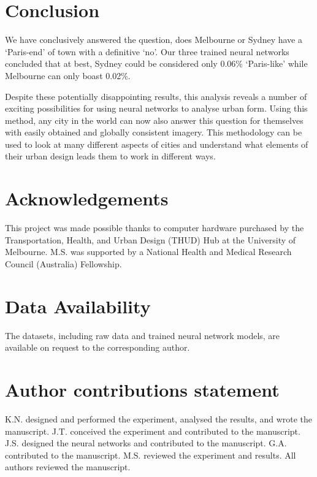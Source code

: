 \documentclass[Crown,sageh,times]{sagej}
\begin{document}
\section{Conclusion}\label{sec:conclusion}

We have conclusively answered the question, does Melbourne or Sydney have a `Paris-end' of town with a definitive `no'. Our three trained neural networks concluded that at best, Sydney could be considered only 0.06\% `Paris-like' while Melbourne can only boast 0.02\%.   

Despite these potentially disappointing results, this analysis reveals a number of exciting possibilities for using neural networks to analyse urban form. Using this method, any city in the world can now also answer this question for themselves with easily obtained and globally consistent imagery. This methodology can be used to look at many different aspects of cities and understand what elements of their urban design leads them to work in different ways.

\section{Acknowledgements}
This project was made possible thanks to computer hardware purchased by the Transportation, Health, and Urban Design (THUD) Hub at the University of Melbourne. M.S. was supported by a National Health and Medical Research Council (Australia) Fellowship.

\section{Data Availability}\label{sec:methods6} 
The datasets, including raw data and trained neural network models, are available on request to the corresponding author.

\section{Author contributions statement}

K.N. designed and performed the experiment, analysed the results, and wrote the manuscript. J.T. conceived the experiment and contributed to the manuscript. J.S. designed the neural networks and contributed to the manuscript. G.A. contributed to the manuscript. M.S. reviewed the experiment and results. All authors reviewed the manuscript. 



\theendnotes
\end{document}
